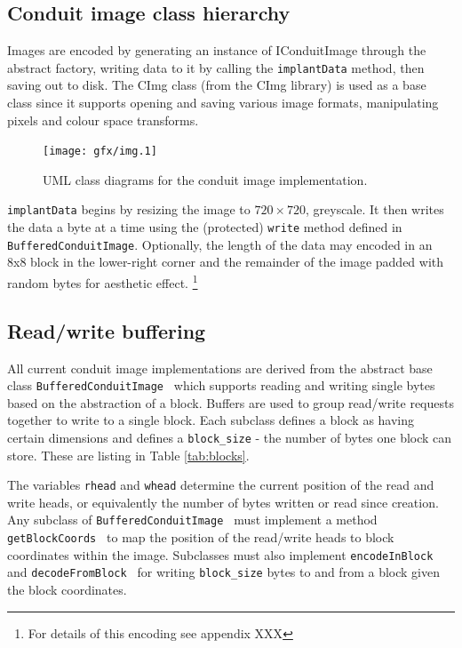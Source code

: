 \FloatBarrier
\subsection{Conduit image class hierarchy}

Images are encoded by generating an instance of IConduitImage through the abstract factory, writing data to it by calling the {\tt implantData} method, then saving out to disk. The CImg class (from the CImg library) is used as a base class since it supports opening and saving various image formats, manipulating pixels and colour space transforms.

    \begin{figure}[tbp]
        \begin{center}
                \texttt{[image: gfx/img.1]}
            \caption{UML class diagrams for the conduit image implementation.}
            \label{uml:img-classes}
        \end{center}
    \end{figure}
    
{\tt implantData} begins by resizing the image to $720 \times 720$, greyscale. It then writes the data a byte at a time using the (protected) {\tt write} method defined in {\tt BufferedConduitImage}. Optionally, the length of the data may encoded in an 8x8 block in the lower-right corner and the remainder of the image padded with random bytes for aesthetic effect. \footnote{For details of this encoding see appendix XXX}


\FloatBarrier
\subsection{Read/write buffering}

All current conduit image implementations are derived from the abstract base class {\tt BufferedConduitImage } which supports reading and writing single bytes based on the abstraction of a block. Buffers are used to group read/write requests together to write to a single block. Each subclass defines a block as having certain dimensions and defines a {\tt block\_size} - the number of bytes one block can store. These are listing in Table \ref{tab:blocks}.

The variables {\tt rhead} and {\tt whead} determine the current position of the read and write heads, or equivalently the number of bytes written or read since creation. Any subclass of {\tt BufferedConduitImage } must implement a method {\tt getBlockCoords } to map the position of the read/write heads to block coordinates within the image. Subclasses must also implement {\tt encodeInBlock } and {\tt decodeFromBlock } for writing {\tt block\_size} bytes to and from a block given the block coordinates.

